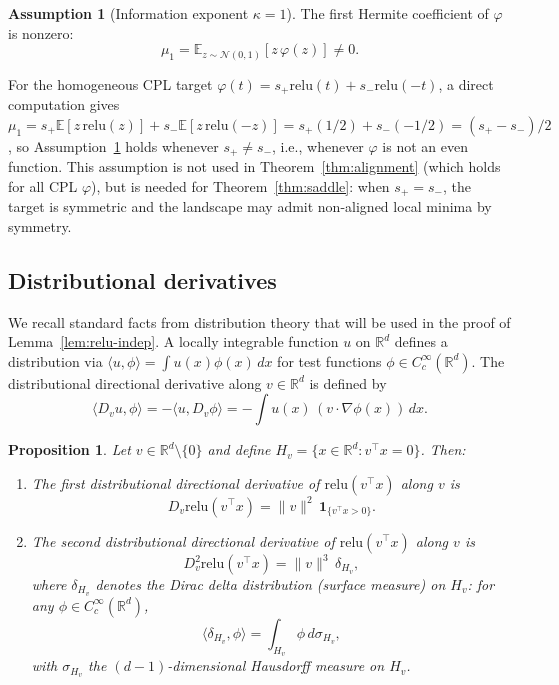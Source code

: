 \documentclass[11pt]{amsart}
\newtheorem{proposition}[theorem]{Proposition}
\theoremstyle{definition}
\newtheorem{assumption}[theorem]{Assumption}
\newcommand{\R}{\mathbb{R}}
\newcommand{\E}{\mathbb{E}}
\newcommand{\inner}[2]{\langle #1, #2 \rangle}
\newcommand{\norm}[1]{\| #1 \|}
\newcommand{\relu}{\mathrm{relu}}
\begin{document}
\begin{assumption}[Information exponent $\kappa = 1$]\label{ass:kappa}
The first Hermite coefficient of $\varphi$ is nonzero:
\[
\mu_1 = \E_{z \sim \mathcal{N}(0,1)}[z \, \varphi(z)] \neq 0.
\]
\end{assumption}

For the homogeneous CPL target $\varphi(t) = s_+ \relu(t) + s_- \relu(-t)$, a
direct computation gives
$\mu_1 = s_+ \E[z\,\relu(z)] + s_- \E[z\,\relu(-z)]
       = s_+(1/2) + s_-(-1/2) = (s_+ - s_-)/2$,
so Assumption~\ref{ass:kappa} holds whenever $s_+ \neq s_-$, i.e., whenever
$\varphi$ is not an even function.  This assumption is not used in
Theorem~\ref{thm:alignment} (which holds for all CPL $\varphi$), but is needed
for Theorem~\ref{thm:saddle}: when $s_+ = s_-$, the target is symmetric and
the landscape may admit non-aligned local minima by symmetry.

\subsection{Distributional derivatives}\label{sec:distrib}

We recall standard facts from distribution theory that will be used in the proof of Lemma~\ref{lem:relu-indep}. A locally integrable function $u$ on $\R^d$ defines a distribution via $\inner{u}{\phi} = \int u(x) \phi(x) \, dx$ for test functions $\phi \in C_c^\infty(\R^d)$. The distributional directional derivative along $v \in \R^d$ is defined by
\[
\inner{D_v u}{\phi} = -\inner{u}{D_v \phi} = -\int u(x) \, (v \cdot \nabla \phi(x)) \, dx.
\]

\begin{proposition}\label{prop:relu-deriv}
Let $v \in \R^d \setminus \{0\}$ and define $H_v = \{x \in \R^d : v^\top x = 0\}$. Then:
\begin{enumerate}[label=(\alph*)]
\item The first distributional directional derivative of $\relu(v^\top x)$ along $v$ is
\[
D_v \relu(v^\top x) = \norm{v}^2 \, \mathbf{1}_{\{v^\top x > 0\}}.
\]
\item The second distributional directional derivative of $\relu(v^\top x)$ along $v$ is
\[
D_v^2 \relu(v^\top x) = \norm{v}^3 \, \delta_{H_v},
\]
where $\delta_{H_v}$ denotes the Dirac delta distribution (surface measure) on $H_v$: for any $\phi \in C_c^\infty(\R^d)$,
\begin{equation}\label{eq:delta-hyperplane}
\inner{\delta_{H_v}}{\phi} = \int_{H_v} \phi \, d\sigma_{H_v},
\end{equation}
with $\sigma_{H_v}$ the $(d{-}1)$-dimensional Hausdorff measure on $H_v$.
\end{enumerate}
\end{proposition}
\end{document}
